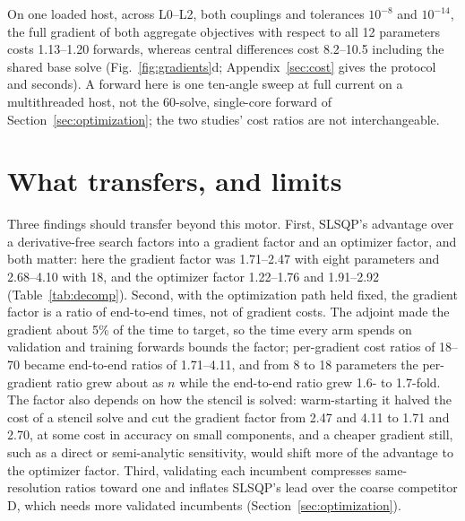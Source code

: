 \documentclass{anvil-paper}
\begin{document}
On one loaded host, across L0--L2, both couplings and tolerances $10^{-8}$
and $10^{-14}$, the full gradient of both aggregate objectives with respect
to all 12 parameters costs 1.13--1.20 forwards, whereas central differences
cost 8.2--10.5 including the shared base solve (Fig.~\ref{fig:gradients}d;
Appendix~\ref{sec:cost} gives the protocol and seconds). A forward here is
one ten-angle sweep at full current on a multithreaded host, not the
60-solve, single-core forward of Section~\ref{sec:optimization}; the two
studies' cost ratios are not interchangeable.

\section{What transfers, and limits}\label{sec:discussion}
Three findings should transfer beyond this motor. First, SLSQP's advantage
over a derivative-free search factors into a gradient factor and an
optimizer factor, and both matter: here the gradient factor was 1.71--2.47
with eight parameters and 2.68--4.10 with 18, and the optimizer factor
1.22--1.76 and 1.91--2.92 (Table~\ref{tab:decomp}). Second, with the
optimization path held fixed, the gradient factor is a ratio of
end-to-end times, not of gradient costs. The adjoint made the gradient
about 5\% of the time to target, so the time every arm spends on
validation and training forwards bounds the factor; per-gradient cost
ratios of 18--70 became end-to-end ratios of 1.71--4.11, and from 8 to 18
parameters the per-gradient ratio grew about as $n$ while the end-to-end
ratio grew 1.6- to 1.7-fold. The factor also depends on how the stencil is
solved: warm-starting it halved the cost of a stencil solve and cut the
gradient factor from 2.47 and 4.11 to 1.71 and 2.70, at some cost in
accuracy on small components, and a cheaper gradient still, such as a
direct or semi-analytic sensitivity, would shift more of the advantage to
the optimizer factor. Third, validating each incumbent compresses
same-resolution ratios toward one and inflates SLSQP's lead over the
coarse competitor D, which needs more validated incumbents
(Section~\ref{sec:optimization}).
\end{document}
